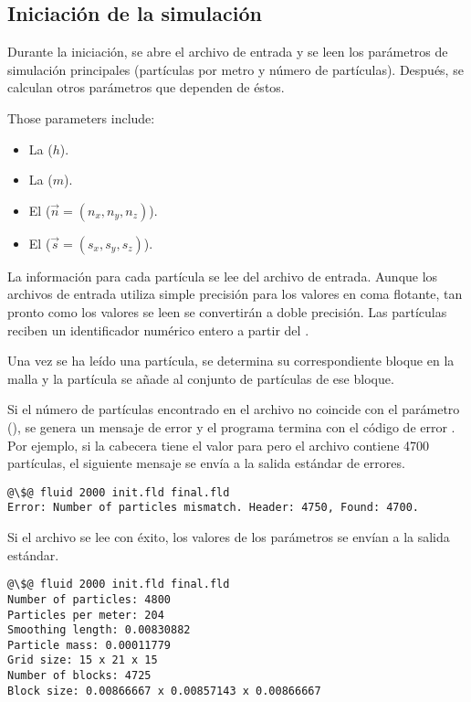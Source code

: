\subsection{Iniciación de la simulación}

Durante la iniciación, se abre el archivo de entrada y se leen los parámetros de
simulación principales (partículas por metro y número de partículas).
Después, se calculan otros parámetros que dependen de éstos.

Those parameters include:
\begin{itemize}
\item La  ($h$).
\item La  ($m$).
\item El  ($\vec{n} = (n_x, n_y, n_z)$).
\item El  ($\vec{s} = (s_x, s_y, s_z)$).
\end{itemize}

La información para cada partícula se lee del archivo de entrada. Aunque los
archivos de entrada utiliza simple precisión para los valores en coma flotante,
tan pronto como los valores se leen se convertirán a doble precisión. Las
partículas reciben un identificador numérico entero a partir del .

Una vez se ha leído una partícula, se determina su correspondiente bloque en la
malla y la partícula se añade al conjunto de partículas de ese bloque.

Si el número de partículas encontrado en el archivo no coincide con el parámetro
 (), se genera un mensaje de error y
el programa termina con el código de error
. Por ejemplo, si la cabecera tiene el valor  para
 pero el archivo contiene 4700 partículas, el siguiente mensaje se
envía a la salida estándar de errores.

\begin{lstlisting}[style=terminal,escapechar=@]
@\$@ fluid 2000 init.fld final.fld
Error: Number of particles mismatch. Header: 4750, Found: 4700.
\end{lstlisting}

Si el archivo se lee con éxito, los valores de los parámetros se envían a la
salida estándar.

\begin{lstlisting}[style=terminal,escapechar=@]
@\$@ fluid 2000 init.fld final.fld
Number of particles: 4800
Particles per meter: 204
Smoothing length: 0.00830882
Particle mass: 0.00011779
Grid size: 15 x 21 x 15
Number of blocks: 4725
Block size: 0.00866667 x 0.00857143 x 0.00866667
\end{lstlisting}

